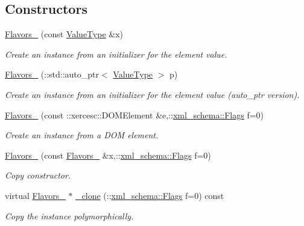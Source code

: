 \subsection*{Constructors}
\begin{DoxyCompactItemize}
\item 
\hyperlink{classopenstack_1_1xml_1_1Flavors___aafcf9e123c992b1d09b7fce7319608bd}{Flavors\_\-} (const \hyperlink{classopenstack_1_1xml_1_1Flavors}{ValueType} \&x)
\begin{DoxyCompactList}\small\item\em Create an instance from an initializer for the element value. \item\end{DoxyCompactList}\item 
\hyperlink{classopenstack_1_1xml_1_1Flavors___af3bc8fcf5efa0a813811a9de49b5fc93}{Flavors\_\-} (::std::auto\_\-ptr$<$ \hyperlink{classopenstack_1_1xml_1_1Flavors}{ValueType} $>$ p)
\begin{DoxyCompactList}\small\item\em Create an instance from an initializer for the element value (auto\_\-ptr version). \item\end{DoxyCompactList}\item 
\hyperlink{classopenstack_1_1xml_1_1Flavors___a2f24aa9321d1baf1dbc7ebbdeff9fa83}{Flavors\_\-} (const ::xercesc::DOMElement \&e,::\hyperlink{namespacexml__schema_affb4c227cbd9aa7453dd1dc5a1401943}{xml\_\-schema::Flags} f=0)
\begin{DoxyCompactList}\small\item\em Create an instance from a DOM element. \item\end{DoxyCompactList}\item 
\hyperlink{classopenstack_1_1xml_1_1Flavors___aa5f6426b6c1120f07bec31a44823a574}{Flavors\_\-} (const \hyperlink{classopenstack_1_1xml_1_1Flavors__}{Flavors\_\-} \&x,::\hyperlink{namespacexml__schema_affb4c227cbd9aa7453dd1dc5a1401943}{xml\_\-schema::Flags} f=0)
\begin{DoxyCompactList}\small\item\em Copy constructor. \item\end{DoxyCompactList}\item 
virtual \hyperlink{classopenstack_1_1xml_1_1Flavors__}{Flavors\_\-} $\ast$ \hyperlink{classopenstack_1_1xml_1_1Flavors___aeccd1cfd809b3a995961edde16da7fe0}{\_\-clone} (::\hyperlink{namespacexml__schema_affb4c227cbd9aa7453dd1dc5a1401943}{xml\_\-schema::Flags} f=0) const 
\begin{DoxyCompactList}\small\item\em Copy the instance polymorphically. \item\end{DoxyCompactList}\end{DoxyCompactItemize}
